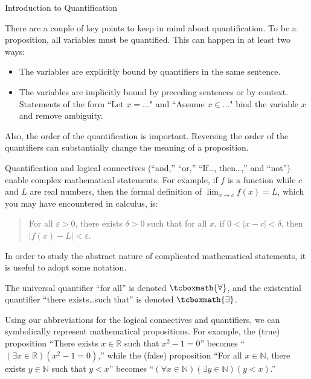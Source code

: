 \begin{section}{Introduction to Quantification}

There are a couple of key points to keep in mind about quantification. To be a proposition, all variables must be quantified.  This can happen in at least two ways:
\begin{itemize}
\item The variables are explicitly bound by quantifiers in the same sentence.
\item The variables are implicitly bound by preceding sentences or by context. Statements of the form ``Let $x=\ldots$" and ``Assume $x\in\ldots$" bind the variable $x$ and remove ambiguity.
\end{itemize}
Also, the order of the quantification is important.  Reversing the order of the quantifiers can substantially change the meaning of a proposition.

Quantification and logical connectives (``and,'' ``or,'' ``If\ldots, then\ldots,'' and ``not'') enable complex mathematical statements. For example, if $f$ is a function while $c$ and $L$ are real numbers, then the formal definition of $\lim_{x\to c}f(x)=L$, which you may have encountered in calculus, is:
\begin{quote}
For all $\varepsilon >0$, there exists $\delta >0$ such that for all $x$, if $0<|x-c|<\delta$, then $|f(x)-L|<\varepsilon$.
\end{quote}

In order to study the abstract nature of complicated mathematical statements, it is useful to adopt some notation.

\begin{definition}\label{def:quantifiers}
The universal quantifier ``for all'' is denoted $\tcboxmath{\forall}$, and the existential quantifier  ``there exists\ldots such that'' is denoted $\tcboxmath{\exists}$.
\end{definition}

Using our abbreviations for the logical connectives and quantifiers, we can symbolically represent mathematical propositions. For example, the (true) proposition ``There exists $x \in \mathbb{R}$ such that $x^2-1=0$'' becomes ``$(\exists x \in \mathbb{R})(x^2-1=0)$,'' while the (false) proposition ``For all $x\in \mathbb{N}$, there exists $y\in\mathbb{N}$ such that $y<x$'' becomes ``$(\forall x\in\mathbb{N})(\exists y\in\mathbb{N})(y<x)$.'' %


\end{section}
